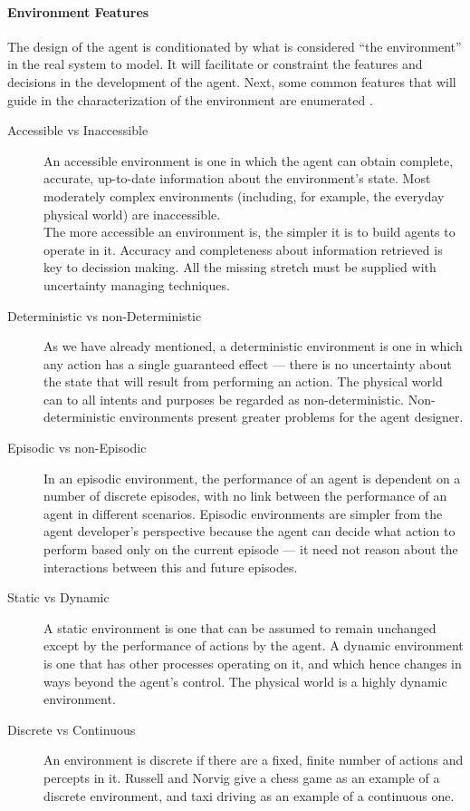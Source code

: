 \documentclass[11pt,oneside,a4paper,openright]{report}
\begin{document}



\paragraph{Environment Features}

The design of the agent is conditionated by what is considered ``the environment'' in the real system to model.
It will facilitate or constraint the features and decisions in the development of the agent. Next, some common features that will guide in the characterization of the environment are enumerated \cite[section 2.3]{RussellNorvig}.

\begin{description} 
	\item [Accessible vs Inaccessible] An accessible environment is one in which the agent
		can obtain complete, accurate, up-to-date information about the environment’s state.
		Most moderately complex environments (including, for example, the everyday physical 
		world) are inaccessible.\\
		The more accessible an environment is, the simpler it is to build agents to operate in it.
		Accuracy and completeness about information retrieved is key to decission making.
		All the missing stretch must be supplied with uncertainty managing techniques.
	\item [Deterministic vs non-Deterministic] As we have already mentioned, a deterministic
		environment is one in which any action has a single guaranteed effect — there is no 
		uncertainty about the state that will result from performing an action.
		The physical world can to all intents and purposes be regarded as non-deterministic.
		Non-deterministic environments present greater problems for the agent designer.
	\item [Episodic vs non-Episodic] In an episodic environment, the performance of an
		agent is dependent on a number of discrete episodes, with no link between the performance
		of an agent in different scenarios. Episodic environments are simpler from the agent
		developer’s perspective because the agent can decide what action to perform based only 
		on the current episode — it need not reason about the interactions between this and future 
		episodes.
	\item [Static vs Dynamic] A static environment is one that can be assumed to remain unchanged 
		except by the performance of actions by the agent. A dynamic environment is one that has 
		other processes operating on it, and which hence changes in ways beyond the agent’s control.
		The physical world is a highly dynamic environment.
	\item [Discrete vs Continuous] An environment is discrete if there are a fixed, finite
		number of actions and percepts in it. Russell and Norvig give a chess game as 
		an example of a discrete environment, and taxi driving as an example of a continuous one.
\end{description}
\end{document}
